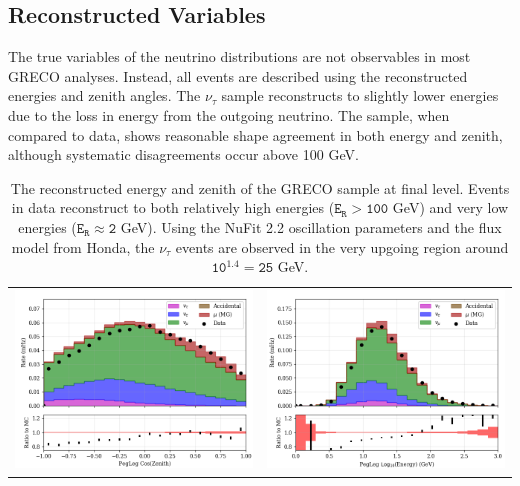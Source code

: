 \label{subsubsec:greco_reco}
\subsection{Reconstructed Variables}
The true variables of the neutrino distributions are not observables in most GRECO analyses.
Instead, all events are described using the reconstructed energies and zenith angles.
The $\mathtt{\nu_\tau}$ sample reconstructs to slightly lower energies due to the loss in energy from the outgoing neutrino.
The sample, when compared to data, shows reasonable shape agreement in both energy and zenith, although systematic disagreements occur above 100 GeV.

\begin{center}
\begin{table}
\begin{tabular}{cc}
	\label{fig:gev_per_nch} \includegraphics[width=0.45\linewidth]{L7_reco_coszen.png} &
	\label{fig:t_rms} \includegraphics[width=0.45\linewidth]{L7_reco_logen.png} \\
\end{tabular}
\label{fig:true_nuproperties}
\caption{The reconstructed energy and zenith of the GRECO sample at final level. Events in data reconstruct to both relatively high energies ($\mathtt{E_{R}>100}$ GeV) and very low energies ($\mathtt{E_{R}\approx2}$ GeV). Using the NuFit 2.2 oscillation parameters and the flux model from Honda, the $\mathtt{\nu_\tau}$ events are observed in the very upgoing region around $\mathtt{10^1.4=25}$ GeV. }
\end{table}
\end{center}